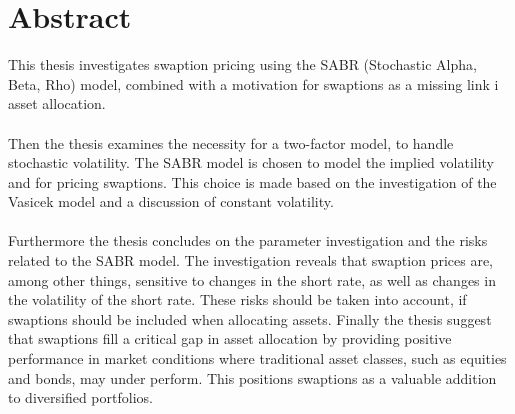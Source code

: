 \section*{Abstract}

This thesis investigates swaption pricing using the SABR (Stochastic Alpha, Beta, Rho) model,
combined with a motivation for swaptions as a missing link i asset allocation. 
\\\\
Then the thesis examines the necessity for a two-factor model, to handle stochastic volatility.
The SABR model is chosen to model the implied volatility and for pricing swaptions. 
This choice is made based on the investigation of the Vasicek model and a discussion of constant volatility.
\\\\
Furthermore the thesis concludes on the parameter investigation and the risks related to the SABR model.
The investigation reveals that swaption prices are, among other things, sensitive to changes in the short rate, 
as well as changes in the volatility of the short rate.
These risks should be taken into account, if swaptions should be included when allocating assets.
Finally the thesis suggest that swaptions fill a critical gap in asset allocation by providing 
positive performance in market conditions where traditional asset classes, 
such as equities and bonds, may under perform. This positions swaptions as a valuable addition to diversified portfolios.


